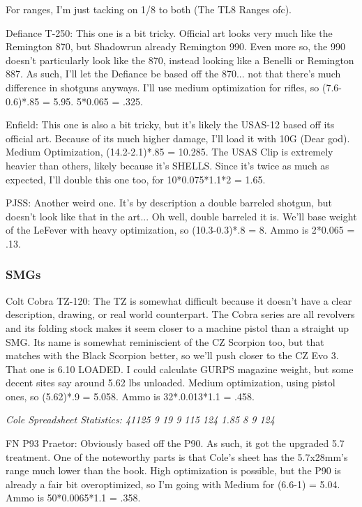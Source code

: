 \begin{multicols*}{2}
	For ranges, I'm just tacking on 1/8 to both (The TL8 Ranges ofc).
	
	Defiance T-250: This one is a bit tricky. Official art looks very much like the Remington 870, but Shadowrun already Remington 990. Even more so, the 990 doesn't particularly look like the 870, instead looking like a Benelli or Remington 887. As such, I'll let the Defiance be based off the 870... not that there's much difference in shotguns anyways. I'll use medium optimization for rifles, so (7.6-0.6)*.85 = 5.95. 5*0.065 = .325.
	
	Enfield: This one is also a bit tricky, but it's likely the USAS-12 based off its official art. Because of its much higher damage, I'll load it with 10G (Dear god). Medium Optimization, (14.2-2.1)*.85 = 10.285. The USAS Clip is extremely heavier than others, likely because it's SHELLS. Since it's twice as much as expected, I'll double this one too, for 10*0.075*1.1*2 = 1.65.
	
	PJSS: Another weird one. It's by description a double barreled shotgun, but doesn't look like that in the art... Oh well, double barreled it is. We'll base weight of the LeFever with heavy optimization, so (10.3-0.3)*.8 = 8. Ammo is  2*0.065 = .13.
	
	\subsubsection{SMGs}
	
	Colt Cobra TZ-120: The TZ is somewhat difficult because it doesn't have a clear description, drawing, or real world counterpart. The Cobra series are all revolvers and its folding stock makes it seem closer to a machine pistol than a straight up SMG. Its name is somewhat reminiscient of the CZ Scorpion too, but that matches with the Black Scorpion better, so we'll push closer to the CZ Evo 3. That one is 6.10 LOADED. I could calculate GURPS magazine weight, but some decent sites say around 5.62 lbs unloaded. Medium optimization, using pistol ones, so (5.62)*.9 = 5.058. Ammo is 32*.0.013*1.1 = .458.
	
	\textit{\textcolor{OliveGreen}{Cole Spreadsheet Statistics: 41125 9 19 9 115 124 1.85 8 9 124 }}
	
	FN P93 Praetor: Obviously based off the P90. As such, it got the upgraded 5.7 treatment. One of the noteworthy parts is that Cole's sheet has the 5.7x28mm's range much lower than the book. High optimization is possible, but the P90 is already a fair bit overoptimized, so I'm going with Medium for (6.6-1) = 5.04. Ammo is 50*0.0065*1.1 = .358.
	

\end{multicols*}

